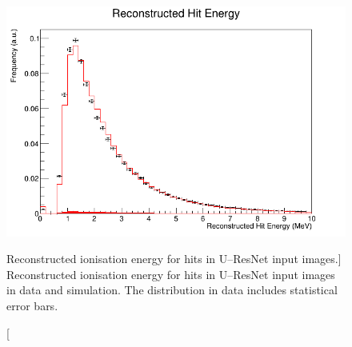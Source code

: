 \begin{figure}
	\centering
	\includegraphics[width=\textwidth]{figures/hit_ion_reco.png}
	\caption
	[Reconstructed ionisation energy for hits in U--ResNet input images.]
	{Reconstructed ionisation energy for hits in U--ResNet input images
	in data and simulation. The distribution in data includes statistical error
	bars.}
	\label{fig:hit_ion_reco}
\end{figure}

